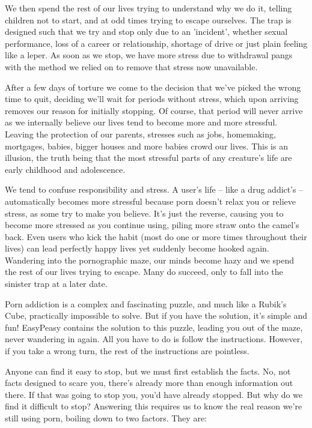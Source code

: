 \documentclass[
]{book}
\begin{document}
We then spend the rest of our lives trying to understand why we do it, telling children not to start, and at odd times trying to escape ourselves. The trap is designed such that we try and stop only due to an 'incident', whether sexual performance, loss of a career or relationship, shortage of drive or just plain feeling like a leper. As soon as we stop, we have more stress due to withdrawal pangs with the method we relied on to remove that stress now unavailable.

After a few days of torture we come to the decision that we've picked the wrong time to quit, deciding we'll wait for periods without stress, which upon arriving removes our reason for initially stopping. Of course, that period will never arrive as we internally believe our lives tend to become more and more stressful. Leaving the protection of our parents, stresses such as jobs, homemaking, mortgages, babies, bigger houses and more babies crowd our lives. This is an illusion, the truth being that the most stressful parts of any creature's life are early childhood and adolescence.

We tend to confuse responsibility and stress. A user's life -- like a drug addict's -- automatically becomes more stressful because porn doesn't relax you or relieve stress, as some try to make you believe. It's just the reverse, causing you to become more stressed as you continue using, piling more straw onto the camel's back. Even users who kick the habit (most do one or more times throughout their lives) can lead perfectly happy lives yet suddenly become hooked again. Wandering into the pornographic maze, our minds become hazy and we spend the rest of our lives trying to escape. Many do succeed, only to fall into the sinister trap at a later date.

Porn addiction is a complex and fascinating puzzle, and much like a Rubik's Cube, practically impossible to solve. But if you have the solution, it's simple and fun! EasyPeasy contains the solution to this puzzle, leading you out of the maze, never wandering in again. All you have to do is follow the instructions. However, if you take a wrong turn, the rest of the instructions are pointless.

Anyone can find it easy to stop, but we must first establish the facts. No, not facts designed to scare you, there's already more than enough information out there. If that was going to stop you, you'd have already stopped. But why do we find it difficult to stop? Answering this requires us to know the real reason we're still using porn, boiling down to two factors. They are:
\end{document}
